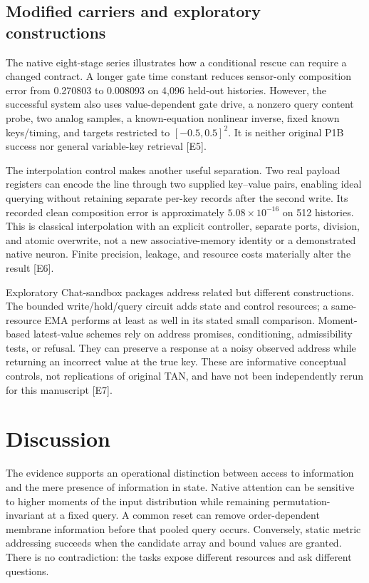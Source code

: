 \documentclass[
  10pt,
]{article}
\begin{document}
\subsection{Modified carriers and exploratory
constructions}\label{modified-carriers-and-exploratory-constructions}

The native eight-stage series illustrates how a conditional rescue can
require a changed contract. A longer gate time constant reduces
sensor-only composition error from 0.270803 to 0.008093 on 4,096
held-out histories. However, the successful system also uses
value-dependent gate drive, a nonzero query content probe, two analog
samples, a known-equation nonlinear inverse, fixed known keys/timing,
and targets restricted to \([-0.5,0.5]^2\). It is neither original P1B
success nor general variable-key retrieval {[}E5{]}.

The interpolation control makes another useful separation. Two real
payload registers can encode the line through two supplied key--value
pairs, enabling ideal querying without retaining separate per-key
records after the second write. Its recorded clean composition error is
approximately \(5.08\times10^{-16}\) on 512 histories. This is classical
interpolation with an explicit controller, separate ports, division, and
atomic overwrite, not a new associative-memory identity or a
demonstrated native neuron. Finite precision, leakage, and resource
costs materially alter the result {[}E6{]}.

Exploratory Chat-sandbox packages address related but different
constructions. The bounded write/hold/query circuit adds state and
control resources; a same-resource EMA performs at least as well in its
stated small comparison. Moment-based latest-value schemes rely on
address promises, conditioning, admissibility tests, or refusal. They
can preserve a response at a noisy observed address while returning an
incorrect value at the true key. These are informative conceptual
controls, not replications of original TAN, and have not been
independently rerun for this manuscript {[}E7{]}.

\section{Discussion}\label{discussion}

The evidence supports an operational distinction between access to
information and the mere presence of information in state. Native
attention can be sensitive to higher moments of the input distribution
while remaining permutation-invariant at a fixed query. A common reset
can remove order-dependent membrane information before that pooled query
occurs. Conversely, static metric addressing succeeds when the candidate
array and bound values are granted. There is no contradiction: the tasks
expose different resources and ask different questions.
\end{document}
